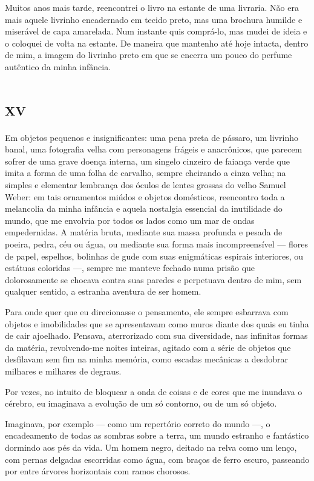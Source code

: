 Muitos anos mais tarde, reencontrei o livro na estante de uma livraria. Não era mais aquele livrinho encadernado em tecido preto, mas uma brochura humilde e miserável de capa amarelada. Num instante quis comprá-lo, mas mudei de ideia e o coloquei de volta na estante. De maneira que mantenho até hoje intacta, dentro de mim, a imagem do livrinho preto em que se encerra um pouco do perfume autêntico da minha infância.


\chapter*{\huge\centering\textsc{xv}}

Em objetos pequenos e insignificantes: uma pena preta de pássaro, um livrinho banal, uma fotografia velha com personagens frágeis e anacrônicos, que parecem sofrer de uma grave doença interna, um singelo cinzeiro de faiança verde que imita a forma de uma folha de carvalho, sempre cheirando a cinza velha; na simples e elementar lembrança dos óculos de lentes grossas do velho Samuel Weber: em tais ornamentos miúdos e objetos domésticos, reencontro toda a melancolia da minha infância e aquela nostalgia essencial da inutilidade do mundo, que me envolvia por todos os lados como um mar de ondas empedernidas. A matéria bruta, mediante sua massa profunda e pesada de poeira, pedra, céu ou água, ou mediante sua forma mais incompreensível --- flores de papel, espelhos, bolinhas de gude com suas enigmáticas espirais interiores, ou estátuas coloridas ---, sempre me manteve fechado numa prisão que dolorosamente se chocava contra suas paredes e perpetuava dentro de mim, sem qualquer sentido, a estranha aventura de ser homem.

Para onde quer que eu direcionasse o pensamento, ele sempre esbarrava com objetos e imobilidades que se apresentavam como muros diante dos quais eu tinha de cair ajoelhado.
Pensava, aterrorizado com sua diversidade, nas infinitas formas da matéria, revolvendo-me noites inteiras, agitado com a série de objetos que desfilavam sem fim na minha memória, como escadas mecânicas a desdobrar milhares e milhares de degraus.

Por vezes, no intuito de bloquear a onda de coisas e de cores que me inundava o cérebro, eu imaginava a evolução de um só contorno, ou de um só objeto.

Imaginava, por exemplo --- como um repertório correto do mundo ---, o encadeamento de todas as sombras sobre a terra, um mundo estranho e fantástico dormindo aos pés da vida.
Um homem negro, deitado na relva como um lenço, com pernas delgadas escorridas como água, com braços de ferro escuro, passeando por entre árvores horizontais com ramos chorosos.

